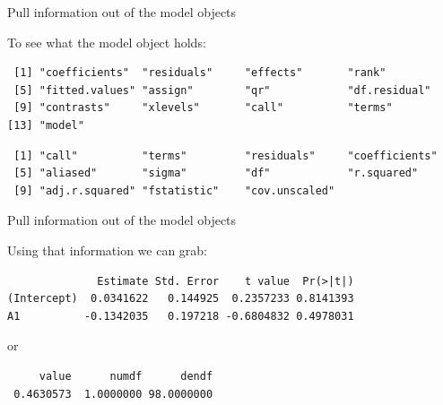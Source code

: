 \begin{frame}[fragile]{Pull information out of the model objects}

To see what the model object holds: \small

\begin{Shaded}
\begin{Highlighting}[]
\end{Highlighting}
\end{Shaded}

\begin{verbatim}
 [1] "coefficients"  "residuals"     "effects"       "rank"         
 [5] "fitted.values" "assign"        "qr"            "df.residual"  
 [9] "contrasts"     "xlevels"       "call"          "terms"        
[13] "model"        
\end{verbatim}

\begin{Shaded}
\begin{Highlighting}[]
\NormalTok{(}
\end{Highlighting}
\end{Shaded}

\begin{verbatim}
 [1] "call"          "terms"         "residuals"     "coefficients" 
 [5] "aliased"       "sigma"         "df"            "r.squared"    
 [9] "adj.r.squared" "fstatistic"    "cov.unscaled" 
\end{verbatim}

\end{frame}

\begin{frame}[fragile]{Pull information out of the model objects}

\center
Using that information we can grab:

\begin{Shaded}
\begin{Highlighting}[]
\OperatorTok{$}
\end{Highlighting}
\end{Shaded}

\begin{verbatim}
              Estimate Std. Error    t value  Pr(>|t|)
(Intercept)  0.0341622   0.144925  0.2357233 0.8141393
A1          -0.1342035   0.197218 -0.6804832 0.4978031
\end{verbatim}

or

\begin{Shaded}
\begin{Highlighting}[]
\OperatorTok{$}
\end{Highlighting}
\end{Shaded}

\begin{verbatim}
     value      numdf      dendf 
 0.4630573  1.0000000 98.0000000 
\end{verbatim}

\end{frame}

